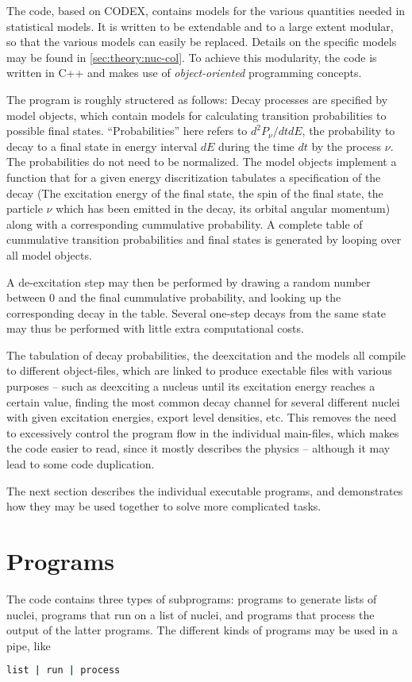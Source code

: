 The \codename{} code, based on CODEX\cite{gollerthan:1988:thesis}, contains models for the various quantities needed in statistical models. It is written to be extendable and to a large extent modular, so that the various models can easily be replaced. Details on the specific models may be found in \autoref{sec:theory:nuc-col}.
To achieve this modularity, the code is written in C++ and makes use of \emph{object-oriented} programming concepts. 

The program is roughly structered as follows:
 Decay processes are specified by model objects, which contain models for calculating transition probabilities to possible final states. ``Probabilities'' here refers to $d^2 P_\nu/dtdE$, the probability to decay to a final state in energy interval $dE$ during the time $dt$ by the process $\nu$. The probabilities do not need to be normalized.
The model objects implement a function that for a given energy discritization tabulates a specification of the decay (The excitation energy of the final state, the spin of the final state, the particle $\nu$ which has been emitted in the decay, its orbital angular momentum) along with a corresponding cummulative probability. A complete table of cummulative transition probabilities and final states is generated by looping over all model objects.

 A de-excitation step may then be performed by drawing a random number between $0$ and the final cummulative probability, and looking up the corresponding decay in the table. Several one-step decays from the same state may thus be performed with little extra computational costs.

The tabulation of decay probabilities, the deexcitation and the models all compile to different object-files, which are linked to produce exectable files with various purposes -- such as deexciting a nucleus until its excitation energy reaches a certain value, finding the most common decay channel for several different nuclei with given excitation energies, export level densities, etc. 
This removes the need to excessively control the program flow in the individual main-files, which makes the code easier to read, since it mostly describes the physics -- although it may lead to some code duplication.

The next section describes the individual executable programs, and demonstrates how they may be used together to solve more complicated tasks.

\section{Programs}
The \codename{} code contains three types of subprograms: programs to generate lists of nuclei, programs that run on a list of nuclei, and programs that process the output of the latter programs.
The different kinds of programs may be used in a pipe, like
\begin{lstlisting}[language=bash]
list | run | process
\end{lstlisting}

